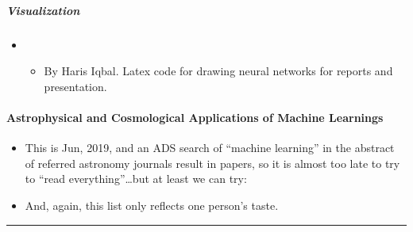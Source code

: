 \documentclass[letterpaper,10pt,english]{sphinxmanual}
\begin{document}
\subparagraph{Visualization}
\label{\detokenize{resource/research/machine_learning/machine_learning_tools:visualization}}\begin{itemize}
\item {} 
\begin{itemize}
\item {} 
By Haris Iqbal. Latex code for drawing neural networks for reports
and presentation.

\end{itemize}

\end{itemize}


\paragraph{Astrophysical and Cosmological Applications of Machine Learnings}
\label{\detokenize{resource/research/machine_learning/mlearning_astro_application:astrophysical-and-cosmological-applications-of-machine-learnings}}\label{\detokenize{resource/research/machine_learning/mlearning_astro_application::doc}}\begin{itemize}
\item {} 
This is Jun, 2019, and an ADS search of “machine learning” in the
abstract of referred astronomy journals result in  papers, so
it is almost too late to try to “read everything”…but at least we can
try:

\item {} 
And, again, this list only reflects one person’s taste.

\end{itemize}


\bigskip\hrule\bigskip
\end{document}

